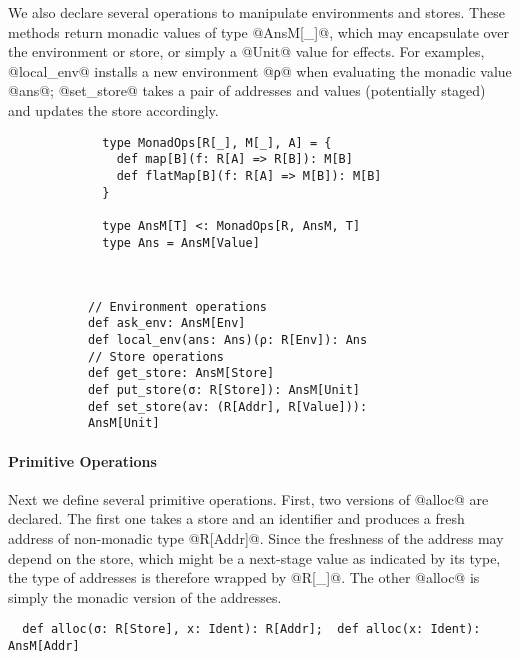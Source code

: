 We also declare several operations to manipulate environments and
stores. These methods return monadic values of type @AnsM[_]@, which
may encapsulate over the environment or store, or simply a @Unit@
value for effects. For examples, @local_env@ installs a new environment
@ρ@ when evaluating the monadic value @ans@; @set_store@ takes a pair of
addresses and values (potentially staged) and updates the store accordingly.

\begin{figure}[h!]
  \centering
  \begin{subfigure}[b]{0.45\textwidth}
    \begin{lstlisting}
  type MonadOps[R[_], M[_], A] = {
    def map[B](f: R[A] => R[B]): M[B]
    def flatMap[B](f: R[A] => M[B]): M[B]
  }
  
  type AnsM[T] <: MonadOps[R, AnsM, T]
  type Ans = AnsM[Value]
    \end{lstlisting}
  \end{subfigure}
  ~
  \begin{subfigure}[b]{0.55\textwidth}
    \begin{lstlisting}
// Environment operations
def ask_env: AnsM[Env]
def local_env(ans: Ans)(ρ: R[Env]): Ans
// Store operations
def get_store: AnsM[Store]
def put_store(σ: R[Store]): AnsM[Unit]
def set_store(av: (R[Addr], R[Value])): AnsM[Unit]
    \end{lstlisting}
  \end{subfigure}
\end{figure}

\paragraph{Primitive Operations} Next we define several primitive operations.
First, two versions of @alloc@ are declared. The first one takes a store and an
identifier and produces a fresh address of non-monadic type @R[Addr]@. Since
the freshness of the address may depend on the store, which might be a
next-stage value as indicated by its type, the type of addresses is therefore
wrapped by @R[_]@. The other @alloc@ is simply the monadic version of the addresses.
\begin{lstlisting}
  def alloc(σ: R[Store], x: Ident): R[Addr];  def alloc(x: Ident): AnsM[Addr]
\end{lstlisting}

